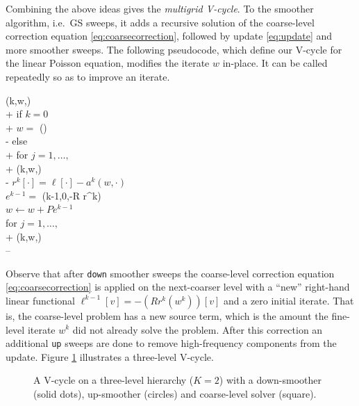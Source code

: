\documentclass[letterpaper,final,12pt,reqno]{amsart}
\begin{document}
Combining the above ideas gives the \emph{multigrid V-cycle}.  To the smoother algorithm, i.e.~GS sweeps, it adds a recursive solution of the coarse-level correction equation \eqref{eq:coarsecorrection}, followed by update \eqref{eq:update} and more smoother sweeps.  The following pseudocode, which define our V-cycle for the linear Poisson equation, modifies the iterate $w$ in-place.  It can be called repeatedly so as to improve an iterate.

\begin{pseudo*}
(k,w,\ell)\text{:} \\+
    if $k=0$ \\+
        $w =$ (\ell) \\-  %
    else \\+
        for $j=1,\dots,$ \\+
            (k,w,\ell) \\-
        $r^k[\cdot] = \ell[\cdot] - a^k(w,\cdot)$ \\
        $e^{k-1} =$ (k-1,0,-R r^k) \\
        $w \gets w + P e^{k-1}$ \\
        for $j=1,\dots,$ \\+
            (k,w,\ell) \\--
\end{pseudo*}

Observe that after \texttt{down} smoother sweeps the coarse-level correction equation \eqref{eq:coarsecorrection} is applied on the next-coarser level with a ``new'' right-hand linear functional $\ell^{k-1}[v]=-(R r^k(w^k))[v]$ and a zero initial iterate.  That is, the coarse-level problem has a new source term, which is the amount the fine-level iterate $w^k$ did not already solve the problem.  After this correction an additional \texttt{up} sweeps are done to remove high-frequency components from the update.  Figure \ref{fig:vcycle} illustrates a three-level V-cycle.

\begin{figure}

\caption{A V-cycle on a three-level hierarchy ($K=2$) with a down-smoother (solid dots), up-smoother (circles) and coarse-level solver (square).}
\label{fig:vcycle}
\end{figure}
\end{document}
